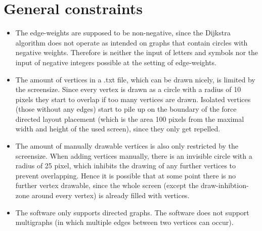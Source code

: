 \documentclass{article}
\begin{document}
\section{General constraints}
\begin{itemize}
\item The edge-weights are supposed to be non-negative, since the Dijkstra algorithm does not operate as intended on graphs that contain circles with negative weights. Therefore is neither the input of letters and symbols nor the input of negative integers possible at the setting of edge-weights.
\item The amount of vertices in a .txt file, which can be drawn nicely, is limited by the screensize. Since every vertex is drawn as a circle with a radius of 10 pixels they start to overlap if too many vertices are drawn. Isolated vertices (those without any edges) start to pile up on the boundary of the force directed layout placement (which is the area 100 pixels from the maximal width and height of the used screen), since they only get repelled.
\item The amount of manually drawable vertices is also only restricted by the screensize. When adding vertices manually, there is an invisible circle with a radius of 25 pixel, which inhibits the drawing of any further vertices to prevent overlapping. Hence it is possible that at some point there is no further vertex drawable, since the whole screen (except the draw-inhibtion-zone around every vertex) is already filled with vertices.
\item The software only supports directed graphs. The software does not support multigraphs (in which multiple edges between two vertices can occur).
\end{itemize}
\end{document}
